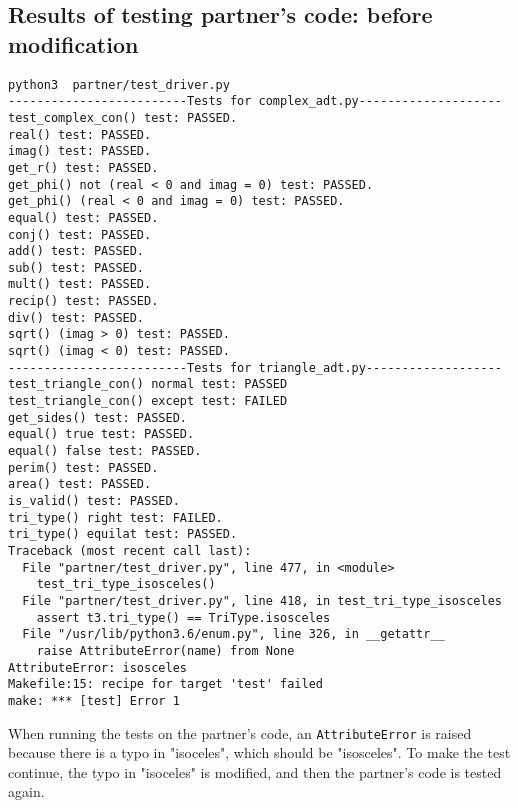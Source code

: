\documentclass[12pt]{article}
\begin{document}
\subsection{Results of testing partner's code: before modification}
\begin{lstlisting}
python3  partner/test_driver.py
-------------------------Tests for complex_adt.py--------------------
test_complex_con() test: PASSED.
real() test: PASSED.
imag() test: PASSED.
get_r() test: PASSED.
get_phi() not (real < 0 and imag = 0) test: PASSED.
get_phi() (real < 0 and imag = 0) test: PASSED.
equal() test: PASSED.
conj() test: PASSED.
add() test: PASSED.
sub() test: PASSED.
mult() test: PASSED.
recip() test: PASSED.
div() test: PASSED.
sqrt() (imag > 0) test: PASSED.
sqrt() (imag < 0) test: PASSED.
-------------------------Tests for triangle_adt.py-------------------
test_triangle_con() normal test: PASSED
test_triangle_con() except test: FAILED
get_sides() test: PASSED.
equal() true test: PASSED.
equal() false test: PASSED.
perim() test: PASSED.
area() test: PASSED.
is_valid() test: PASSED.
tri_type() right test: FAILED.
tri_type() equilat test: PASSED.
Traceback (most recent call last):
  File "partner/test_driver.py", line 477, in <module>
    test_tri_type_isosceles()
  File "partner/test_driver.py", line 418, in test_tri_type_isosceles
    assert t3.tri_type() == TriType.isosceles
  File "/usr/lib/python3.6/enum.py", line 326, in __getattr__
    raise AttributeError(name) from None
AttributeError: isosceles
Makefile:15: recipe for target 'test' failed
make: *** [test] Error 1
\end{lstlisting}
When running the tests on the partner's code, an \verb|AttributeError| is raised because there is a typo in "isoceles", which should be "isosceles".
To make the test continue, the typo in "isoceles" is modified, and then the partner's code is tested again.
\end{document}
